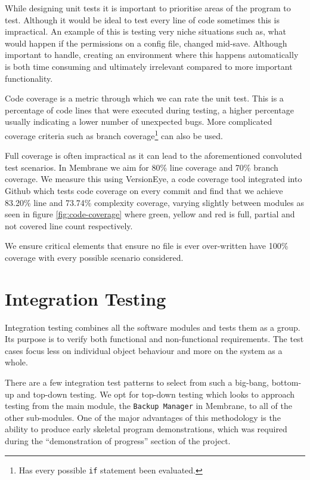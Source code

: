 \documentclass[11pt, a4paper, twoside]{report}
\def\code#1{\texttt{#1}}
\begin{document}
While designing unit tests it is important to prioritise areas of the program to test. Although it would be ideal to test every line of code sometimes this is impractical. An example of this is testing very niche situations such as, what would happen if the permissions on a config file, changed mid-save. Although important to handle, creating an environment where this happens automatically is both time consuming and ultimately irrelevant compared to more important functionality.

Code coverage is a metric through which we can rate the unit test. This is a percentage of code lines that were executed during testing, a higher percentage usually indicating a lower number of unexpected bugs. \citep{miller1963systematic} More complicated coverage criteria such as branch coverage\footnote{Has every possible \code{if} statement been evaluated.} can also be used.

Full coverage is often impractical as it can lead to the aforementioned convoluted test scenarios. In Membrane we aim for 80\% line coverage and 70\% branch coverage. We measure this using VersionEye, a code coverage tool integrated into Github which tests code coverage on every commit and find that we achieve 83.20\% line and 73.74\% complexity coverage, varying slightly between modules as seen in figure \ref{fig:code-coverage} where green, yellow and red is full, partial and not covered line count respectively.

We ensure critical elements that ensure no file is ever over-written have 100\% coverage with every possible scenario considered.

\section{Integration Testing}

Integration testing combines all the software modules and tests them as a group. Its purpose is to verify both functional and non-functional requirements. The test cases focus less on individual object behaviour and more on the system as a whole.

There are a few integration test patterns to select from such a big-bang, bottom-up and top-down testing. \citep{binder2000testing} We opt for top-down testing which looks to approach testing from the main module, the \code{Backup Manager} in Membrane, to all of the other sub-modules. One of the major advantages of this methodology is the ability to produce early skeletal program demonstrations, which was required during the ``demonstration of progress'' section of the project.
\end{document}
